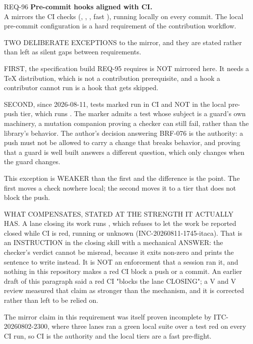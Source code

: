 \begin{reqbox}{REQ-96}{\stable}
\textbf{Pre-commit hooks aligned with CI.}\\
A  mirrors the CI checks (,
, , fast ), running
locally on every commit. The local pre-commit configuration is a hard
requirement of the contribution workflow.

TWO DELIBERATE EXCEPTIONS to the mirror, and they are stated rather than
left as silent gaps between requirements.

FIRST, the specification build REQ-95 requires is NOT mirrored here. It
needs a TeX distribution, which is not a contribution prerequisite, and a
hook a contributor cannot run is a hook that gets skipped.

SECOND, since 2026-08-11, tests marked  run in CI and NOT
in the local pre-push tier, which runs . The
marker admits a test whose subject is a guard's own machinery, a mutation
companion proving a checker can still fail, rather than the library's
behavior. The author's decision answering BRF-076 is the authority: a push
must not be allowed to carry a change that breaks behavior, and proving
that a guard is well built answers a different question, which only
changes when the guard changes.

This exception is WEAKER than the first and the difference is the point.
The first moves a check nowhere local; the second moves it to a tier that
does not block the push.

WHAT COMPENSATES, STATED AT THE STRENGTH IT ACTUALLY HAS. A lane closing
its work runs , which refuses to
let the work be reported closed while CI is red, running or unknown
(INC-20260811-1745-itaca). That is an INSTRUCTION in the closing skill
with a mechanical ANSWER: the checker's verdict cannot be misread, because
it exits non-zero and prints the sentence to write instead. It is NOT an
enforcement that a session ran it, and nothing in this repository makes a
red CI block a push or a commit. An earlier draft of this paragraph said a
red CI "blocks the lane CLOSING"; a V and V review measured that claim as
stronger than the mechanism, and it is corrected rather than left to be
relied on.

The mirror claim in this requirement was itself proven incomplete by
ITC-20260802-2300, where three lanes ran a green local suite over a test
red on every CI run, so CI is the authority and the local tiers are a fast
pre-flight.
\end{reqbox}

